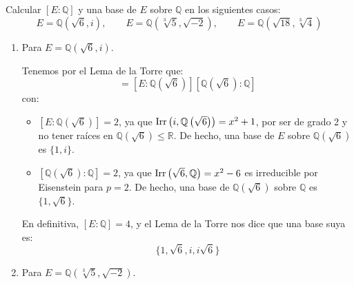 \begin{ejercicio}
    Calcular $[E:\mathbb{Q}]$ y una base de $E$ sobre $\mathbb{Q}$ en los siguientes casos:
    \begin{equation*}
        E = \mathbb{Q}\left(\sqrt{6},i\right), \qquad E= \mathbb{Q}\left(\sqrt[3]{5},\sqrt{-2}\right), \qquad E = \mathbb{Q}\left(\sqrt{18},\sqrt[3]{4}\right)
    \end{equation*}
    \begin{enumerate}[label=\alph*)]
        \item Para $E = \mathbb{Q}\left(\sqrt{6},i\right)$.

            Tenemos por el Lema de la Torre que:
            \begin{equation*}
                [E:\mathbb{Q}] = \left[E:\mathbb{Q}\left(\sqrt{6}\right)\right]\left[\mathbb{Q}\left(\sqrt{6}\right):\mathbb{Q}\right]
            \end{equation*}
            con:
            \begin{itemize}
                \item $\left[E:\mathbb{Q}\left(\sqrt{6}\right)\right] = 2$, ya que $\operatorname{Irr}\left(i,\mathbb{Q}\left(\sqrt{6}\right)\right) = x^2+1$, por ser de grado 2 y no tener raíces en $\mathbb{Q}\left(\sqrt{6}\right)\leq \mathbb{R}$. De hecho, una base de $E$ sobre $\mathbb{Q}\left(\sqrt{6}\right)$ es $\{1,i\}$.
                \item $\left[\mathbb{Q}\left(\sqrt{6}\right):\mathbb{Q}\right] = 2$, ya que $\operatorname{Irr}\left(\sqrt{6},\mathbb{Q}\right) = x^2-6$ es irreducible por Eisenstein para $p=2$. De hecho, una base de $\mathbb{Q}\left(\sqrt{6}\right)$ sobre $\mathbb{Q}$ es $\{1,\sqrt{6}\}$.
            \end{itemize}

            En definitiva, $[E:\mathbb{Q}] = 4$, y el Lema de la Torre nos dice que una base suya es:
            \begin{equation*}
                \{1, \sqrt{6}, i, i\sqrt{6}\}
            \end{equation*}
        \item Para $E= \mathbb{Q}\left(\sqrt[3]{5},\sqrt{-2}\right)$.


\end{enumerate}
\end{ejercicio}
